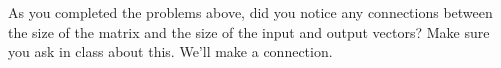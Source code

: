As you completed the problems above, did you notice any connections between the size of the matrix and the size of the input and output vectors?  Make sure you ask in class about this.  We'll make a connection.
%
%



